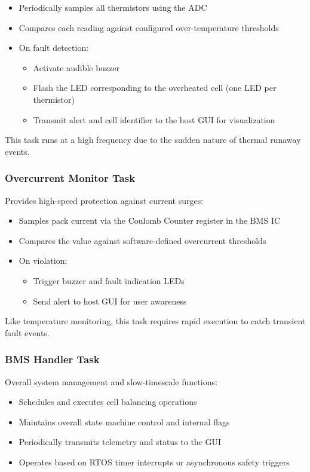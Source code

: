 \documentclass[12pt]{article}
\begin{document}
\begin{itemize}
    \item Periodically samples all thermistors using the ADC
    \item Compares each reading against configured over-temperature thresholds
    \item On fault detection:
    \begin{itemize}
        \item Activate audible buzzer
        \item Flash the LED corresponding to the overheated cell (one LED per thermistor)
        \item Transmit alert and cell identifier to the host GUI for visualization
    \end{itemize}
\end{itemize}

This task runs at a high frequency due to the sudden nature of thermal runaway events.

\subsubsection{Overcurrent Monitor Task}

Provides high-speed protection against current surges:

\begin{itemize}
    \item Samples pack current via the Coulomb Counter register in the BMS IC
    \item Compares the value against software-defined overcurrent thresholds
    \item On violation:
    \begin{itemize}
        \item Trigger buzzer and fault indication LEDs
        \item Send alert to host GUI for user awareness
    \end{itemize}
\end{itemize}

Like temperature monitoring, this task requires rapid execution to catch transient fault events.

\subsubsection{BMS Handler Task}

Overall system management and slow-timescale functions:

\begin{itemize}
    \item Schedules and executes cell balancing operations
    \item Maintains overall state machine control and internal flags
    \item Periodically transmits telemetry and status to the GUI
    \item Operates based on RTOS timer interrupts or asynchronous safety triggers
\end{itemize}
\end{document}
